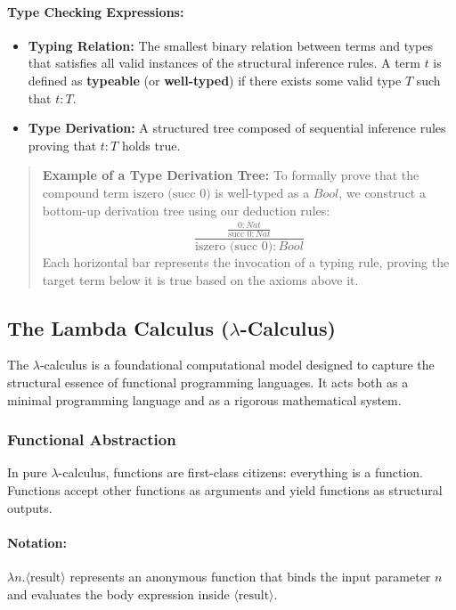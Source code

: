 \documentclass{article}
\begin{document}
\paragraph{Type Checking Expressions:}
\begin{itemize}
  \item \textbf{Typing Relation:} The smallest binary relation between terms and types that satisfies all valid instances of the structural inference rules. A term $t$ is defined as \textbf{typeable} (or \textbf{well-typed}) if there exists some valid type $T$ such that $t : T$.
  \item \textbf{Type Derivation:} A structured tree composed of sequential inference rules proving that $t : T$ holds true.
\end{itemize}

\begin{quote}
\textbf{Example of a Type Derivation Tree:} 
To formally prove that the compound term $\text{iszero (succ 0)}$ is well-typed as a $Bool$, we construct a bottom-up derivation tree using our deduction rules:
\[
\frac{\displaystyle\frac{\overline{0 : Nat}}{\text{succ } 0 : Nat}}{\text{iszero (succ 0)} : Bool}
\]
Each horizontal bar represents the invocation of a typing rule, proving the target term below it is true based on the axioms above it.
\end{quote}

\subsection{The Lambda Calculus (\texorpdfstring{$\lambda$}{lambda}-Calculus)}
The $\lambda$-calculus is a foundational computational model designed to capture the structural essence of functional programming languages. It acts both as a minimal programming language and as a rigorous mathematical system.

\subsubsection{Functional Abstraction}
In pure $\lambda$-calculus, functions are first-class citizens: everything is a function. Functions accept other functions as arguments and yield functions as structural outputs.

\paragraph{Notation:} $\lambda n . \langle\text{result}\rangle$ represents an anonymous function that binds the input parameter $n$ and evaluates the body expression inside $\langle\text{result}\rangle$.
\end{document}
